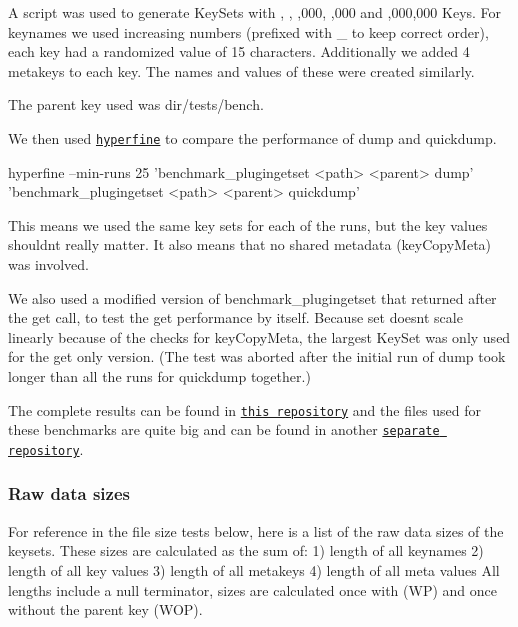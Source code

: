 A script was used to generate Key\+Sets with {}, {}, {,000}, {,000} and {,000,000} Keys. For keynames we used increasing numbers (prefixed with {\ttfamily \+\_\+} to keep correct order), each key had a randomized value of 15 characters. Additionally we added 4 metakeys to each key. The names and values of these were created similarly.

The parent key used was {\ttfamily dir/tests/bench}.

We then used \href{https://github.com/sharkdp/hyperfine}{\tt {\ttfamily hyperfine}} to compare the performance of {\ttfamily dump} and {\ttfamily quickdump}.


\begin{DoxyCode}
hyperfine --min-runs 25 'benchmark\_plugingetset <path> <parent> dump' 'benchmark\_plugingetset <path>
       <parent> quickdump'
\end{DoxyCode}


This means we used the same key sets for each of the runs, but the key values shouldn\textquotesingle{}t really matter. It also means that no shared metadata ({\ttfamily key\+Copy\+Meta}) was involved.

We also used a modified version of {\ttfamily benchmark\+\_\+plugingetset} that returned after the {\ttfamily get} call, to test the {\ttfamily get} performance by itself. Because {\ttfamily set} doesn\textquotesingle{}t scale linearly because of the checks for {\ttfamily key\+Copy\+Meta}, the largest Key\+Set was only used for the {\ttfamily get} only version. (The test was aborted after the initial run of {\ttfamily dump} took longer than all the runs for {\ttfamily quickdump} together.)

The complete results can be found in \href{https://github.com/ElektraInitiative/rawdata}{\tt this repository} and the files used for these benchmarks are quite big and can be found in another \href{https://github.com/kodebach/eqd-bench}{\tt separate repository}.

\subsubsection*{Raw data sizes}

For reference in the file size tests below, here is a list of the raw data sizes of the keysets. These sizes are calculated as the sum of\+: 1) length of all keynames 2) length of all key values 3) length of all metakeys 4) length of all meta values All lengths include a null terminator, sizes are calculated once with (WP) and once without the parent key (W\+OP).

